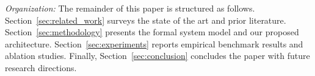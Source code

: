 \textit{Organization:} The remainder of this paper is structured as follows. Section~\ref{sec:related_work} surveys the state of the art and prior literature. Section~\ref{sec:methodology} presents the formal system model and our proposed architecture. Section~\ref{sec:experiments} reports empirical benchmark results and ablation studies. Finally, Section~\ref{sec:conclusion} concludes the paper with future research directions.
